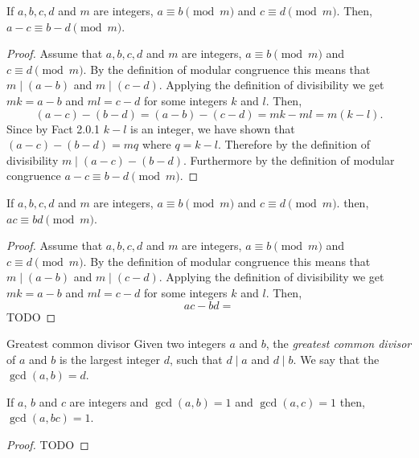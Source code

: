 \documentclass{report}
\begin{document}
\begin{proposition}{}{}
  If $a,b,c,d$ and $m$ are integers, $a \equiv b \pmod{m}$ and $c \equiv d \pmod{m}$. Then, $a - c \equiv b - d \pmod{m}$.
\end{proposition}

\begin{proof}
  Assume that $a,b,c,d$ and $m$ are integers, $a \equiv b \pmod{m}$ and $c \equiv d \pmod{m}$.
  By the definition of modular congruence this means that $m \mid (a - b)$ and $m \mid (c - d)$.
  Applying the definition of divisibility we get $mk = a - b$ and $ml = c - d$ for some integers $k$ and $l$.
  Then, $$(a - c) -(b - d) = (a - b) -(c - d) = mk - ml = m(k-l).$$
  Since by Fact 2.0.1 $k - l$ is an integer, we have shown that $(a - c) - (b - d) = mq$ where $q = k - l$.
  Therefore by the definition of divisibility $m \mid (a - c) - (b - d)$.
  Furthermore by the definition of modular congruence $a - c \equiv b - d \pmod{m}$.
\end{proof}

\begin{proposition}{}{}
  If $a,b,c,d$ and $m$ are integers, $a \equiv b \pmod{m}$ and $c \equiv d \pmod{m}$. then, $ac \equiv bd \pmod{m}$.
\end{proposition}

\begin{proof}
  Assume that $a,b,c,d$ and $m$ are integers, $a \equiv b \pmod{m}$ and $c \equiv d \pmod{m}$.
  By the definition of modular congruence this means that $m \mid (a - b)$ and $m \mid (c - d)$.
  Applying the definition of divisibility we get $mk = a - b$ and $ml = c - d$ for some integers $k$ and $l$.
  Then, $$ac - bd = $$
  TODO
\end{proof}

\begin{definition}{Greatest common divisor}{}
  Given two integers $a$ and $b$, the \emph{greatest common divisor} of $a$ and $b$ is the largest integer $d$, such that $d \mid a$ and $d \mid b$.
  We say that the $\gcd(a, b) = d$.
\end{definition}

\begin{lemma}{}{}
  If $a$, $b$ and $c$ are integers and $\gcd(a, b)  = 1$ and $\gcd(a, c) = 1$ then, $\gcd(a, bc) = 1$.
\end{lemma}

\begin{proof}
  TODO
\end{proof}
\end{document}
